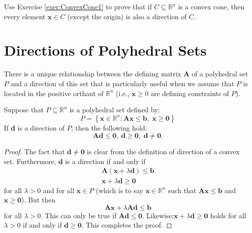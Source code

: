 \begin{exercise} Use Exercise \ref{exer:ConvexCone1} to prove that if $C \subseteq \mathbb{R}^n$ is a convex cone, then every element $\mathbf{x} \in C$ (except the origin) is also a direction of $C$.
\end{exercise}

\section{Directions of Polyhedral Sets}
There is a unique relationship between the defining matrix $\mathbf{A}$ of a polyhedral set $P$ and a direction of this set that is particularly useful when we assume that $P$ is located in the positive orthant of $\mathbb{R}^n$ (i.e., $\mathbf{x} \geq 0$ are defining constraints of $P$). 
\begin{theorem} Suppose that $P \subseteq \mathbb{R}^n$ is a polyhedral set defined by:
\begin{equation}
P = \left\{\mathbf{x} \in \mathbb{R}^n : \mathbf{A} \mathbf{x} \leq \mathbf{b},\;\mathbf{x} \geq \mathbf{0}\right\}
\end{equation}
If $\mathbf{d}$ is a direction of $P$, then the following hold:
\begin{equation}
\mathbf{A}\mathbf{d} \leq \mathbf{0},\:\mathbf{d} \geq \mathbf{0},\;\mathbf{d} \neq \mathbf{0}. 
\end{equation}
\label{thm:DirectionChar}
\end{theorem}
\begin{proof} The fact that $\mathbf{d} \neq \mathbf{0}$ is clear from the definition of direction of a convex set. Furthermore, $\mathbf{d}$ is a direction if and only if 
\begin{gather}
\mathbf{A}\left(\mathbf{x} + \lambda\mathbf{d}\right) \leq \mathbf{b}\\
\mathbf{x} + \lambda\mathbf{d} \geq \mathbf{0}
\end{gather}
for all $\lambda > 0$ and for all $\mathbf{x} \in P$ (which is to say $\mathbf{x}\in \mathbb{R}^n$ such that $\mathbf{A}\mathbf{x} \leq \mathbf{b}$ and $\mathbf{x} \geq \mathbf{0}$). But then 
\begin{displaymath}
\mathbf{A}\mathbf{x} + \lambda\mathbf{A}\mathbf{d} \leq \mathbf{b}
\end{displaymath}
for all $\lambda > 0$. This can only be true if $\mathbf{A}\mathbf{d} \leq \mathbf{0}$. Likewise:$\mathbf{x} + \lambda\mathbf{d} \geq \mathbf{0}$ holds for all $\lambda > 0$ if and only if $\mathbf{d} \geq \mathbf{0}$. This completes the proof.
\end{proof}
